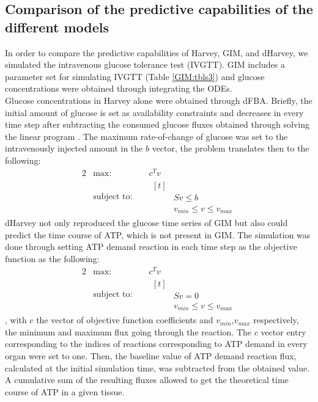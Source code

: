 \subsection{Comparison of the predictive capabilities of the different models}
In order to compare the predictive capabilities of Harvey, GIM, and dHarvey, we simulated the intravenous glucose tolerance test (IVGTT). GIM includes a parameter set for simulating IVGTT (Table \ref{GIM:tbls3}) and glucose concentrations were obtained through integrating the ODEs.\\
Glucose concentrations in Harvey alone were obtained through dFBA. Briefly, the initial amount of glucose is set as availability constraints and decreases in every time step after subtracting the consumed glucose fluxes obtained through solving the linear program \cite{mahadevan2002dynamic}. The maximum rate-of-change of glucose was set to the intravenously injected amount in the $b$ vector, the problem translates then to the following:
\begin{alignat*}{2}
  & \text{max: } &  & c^{T}v\\
  & \text{subject to: } &  &  
                \begin{aligned}[t] \\
                & Sv \leq b \\
                & v_{min} \leq v  \leq  v_{max}
                \end{aligned}
\end{alignat*}
dHarvey not only reproduced the glucose time series of GIM but also could predict the time course of ATP, which is not present in GIM. The simulation was done through setting ATP demand reaction in each time step as the objective function as the following:
\begin{alignat*}{2}
  & \text{max: } &  & c^{T}v\\
  & \text{subject to: } &  &  
                \begin{aligned}[t] \\
                & Sv=0 \\
                & v_{min} \leq v  \leq  v_{max}
                \end{aligned}
\end{alignat*}
, with $c$ the vector of objective function coefficients and $v_{min}$,$v_{max}$ respectively, the minimum and maximum flux going through the reaction. The $c$ vector entry corresponding to the indices of reactions corresponding to ATP demand in every organ were set to one. Then, the baseline value of ATP demand reaction flux, calculated at the initial simulation time, was subtracted from the obtained value. A cumulative sum of the resulting fluxes allowed to get the theoretical time course of ATP in a given tissue. 

